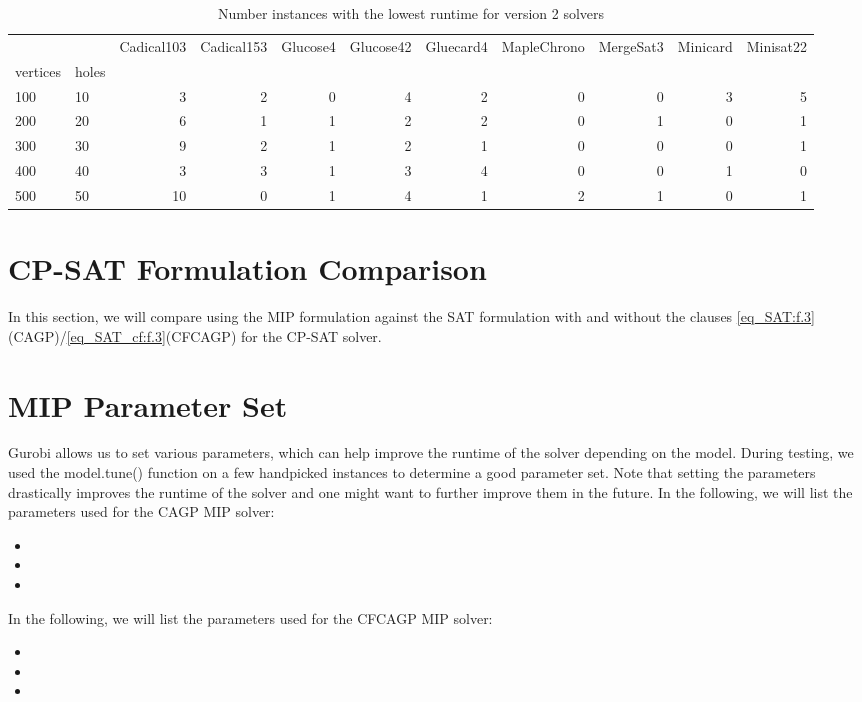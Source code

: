 \begin{table}[htbp]
\tiny
\centering
\begin{tabular}{llrrrrrrrrr}
\toprule
 & & Cadical103 & Cadical153 & Glucose4 & Glucose42 & Gluecard4 & MapleChrono & MergeSat3 & Minicard & Minisat22 \\
vertices & holes &  &  &  &  &  &  &  &  &  \\
\midrule
100 & 10 & 3 & 2 & 0 & 4 & 2 & 0 & 0 & 3 & 5 \\
\cline{1-11}
200 & 20 & 6 & 1 & 1 & 2 & 2 & 0 & 1 & 0 & 1 \\
\cline{1-11}
300 & 30 & 9 & 2 & 1 & 2 & 1 & 0 & 0 & 0 & 1 \\
\cline{1-11}
400 & 40 & 3 & 3 & 1 & 3 & 4 & 0 & 0 & 1 & 0 \\
\cline{1-11}
500 & 50 & 10 & 0 & 1 & 4 & 1 & 2 & 1 & 0 & 1 \\
\cline{1-11}
\bottomrule
\end{tabular}
\caption{Number instances with the lowest runtime for version 2 solvers}
\label{tab:SAT_small_time_v2}
\end{table}

\section{CP-SAT Formulation Comparison}
In this section, we will compare using the MIP formulation against the SAT formulation with and without the clauses \cref{eq_SAT:f.3}(CAGP)/\cref{eq_SAT_cf:f.3}(CFCAGP) for the CP-SAT solver. 

\section{MIP Parameter Set}
Gurobi allows us to set various parameters, which can help improve the runtime of the solver depending on the model. During testing, we used the model.tune() function on a few handpicked instances to determine a good parameter set. Note that setting the parameters drastically improves the runtime of the solver and one might want to further improve them in the future. In the following, we will list the parameters used for the CAGP MIP solver:
\begin{itemize}
  \item 
  \item 
  \item 
\end{itemize}
In the following, we will list the parameters used for the CFCAGP MIP solver:
\begin{itemize}
  \item 
  \item 
  \item 
\end{itemize}

